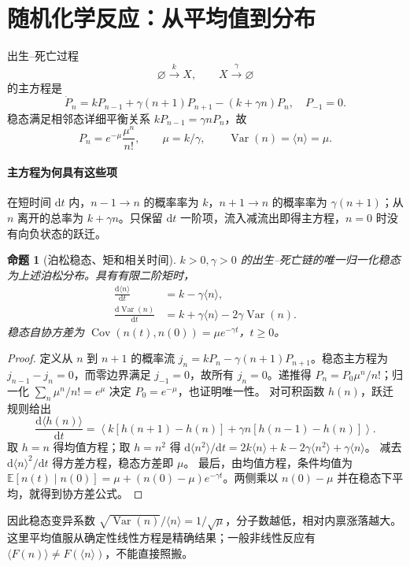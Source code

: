 \documentclass[11pt,a4paper,UTF8,fontset=fandol]{ctexart}
\newtheorem{proposition}{命题}[section]
\newcommand{\dd}{\mathrm d}\newcommand{\R}{\mathbb R}\newcommand{\ssv}{\mathrm{ss}}
\begin{document}
\section{随机化学反应：从平均值到分布}
出生--死亡过程
\begin{equation}\varnothing\xrightarrow{k}X,\qquad X\xrightarrow{\gamma}\varnothing\end{equation}
的主方程是
\begin{equation}\dot P_n=kP_{n-1}+\gamma(n+1)P_{n+1}-(k+\gamma n)P_n,\quad P_{-1}=0.\end{equation}
稳态满足相邻态详细平衡关系 $kP_{n-1}=\gamma nP_n$，故
\begin{equation}P_n=e^{-\mu}\frac{\mu^n}{n!},\qquad\mu=k/\gamma,\qquad\operatorname{Var}(n)=\langle n\rangle=\mu.\end{equation}


\paragraph{主方程为何具有这些项}
在短时间 $\dd t$ 内，$n-1\to n$ 的概率率为 $k$，$n+1\to n$ 的概率率为 $\gamma(n+1)$；从 $n$ 离开的总率为 $k+\gamma n$。只保留 $\dd t$ 一阶项，流入减流出即得主方程，$n=0$ 时没有向负状态的跃迁。
\begin{proposition}[泊松稳态、矩和相关时间]
$k>0,\gamma>0$ 的出生--死亡链的唯一归一化稳态为上述泊松分布。具有有限二阶矩时，
\begin{align}
\frac{\dd\langle n\rangle}{\dd t}&=k-\gamma\langle n\rangle,\\
\frac{\dd\operatorname{Var}(n)}{\dd t}&=k+\gamma\langle n\rangle-2\gamma\operatorname{Var}(n).
\end{align}
稳态自协方差为 $\operatorname{Cov}(n(t),n(0))=\mu e^{-\gamma t}$，$t\geq0$。
\end{proposition}
\begin{proof}
定义从 $n$ 到 $n+1$ 的概率流 $j_n=kP_n-\gamma(n+1)P_{n+1}$。稳态主方程为 $j_{n-1}-j_n=0$，而零边界满足 $j_{-1}=0$，故所有 $j_n=0$。递推得 $P_n=P_0\mu^n/n!$；归一化 $\sum_n\mu^n/n!=e^\mu$ 决定 $P_0=e^{-\mu}$，也证明唯一性。
对可积函数 $h(n)$，跃迁规则给出
\[
\frac{\dd\langle h(n)\rangle}{\dd t}
=\left\langle k[h(n+1)-h(n)]+\gamma n[h(n-1)-h(n)]\right\rangle.
\]
取 $h=n$ 得均值方程；取 $h=n^2$ 得
$\dd\langle n^2\rangle/\dd t=2k\langle n\rangle+k-2\gamma\langle n^2\rangle+\gamma\langle n\rangle$。
减去 $\dd\langle n\rangle^2/\dd t$ 得方差方程，稳态方差即 $\mu$。
最后，由均值方程，条件均值为
$\mathbb E[n(t)\mid n(0)]=\mu+(n(0)-\mu)e^{-\gamma t}$。两侧乘以 $n(0)-\mu$ 并在稳态下平均，就得到协方差公式。
\end{proof}
因此稳态变异系数 $\sqrt{\operatorname{Var}(n)}/\langle n\rangle=1/\sqrt\mu$，分子数越低，相对内禀涨落越大。这里平均值服从确定性线性方程是精确结果；一般非线性反应有 $\langle F(n)\rangle\ne F(\langle n\rangle)$，不能直接照搬。
\end{document}
